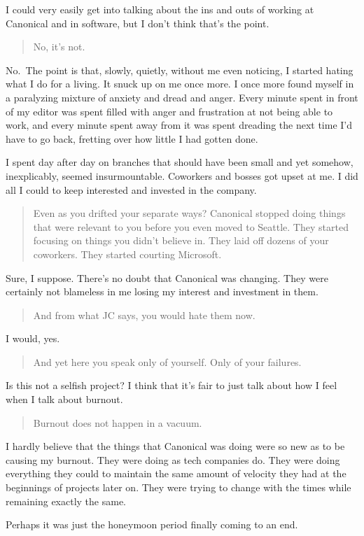 I could very easily get into talking about the ins and outs of working at Canonical and in software, but I don't think that's the point.

\begin{quote}
No, it's not.
\end{quote}

No.~The point is that, slowly, quietly, without me even noticing, I started hating what I do for a living. It snuck up on me once more. I once more found myself in a paralyzing mixture of anxiety and dread and anger. Every minute spent in front of my editor was spent filled with anger and frustration at not being able to work, and every minute spent away from it was spent dreading the next time I'd have to go back, fretting over how little I had gotten done.

I spent day after day on branches that should have been small and yet somehow, inexplicably, seemed insurmountable. Coworkers and bosses got upset at me. I did all I could to keep interested and invested in the company.

\begin{quote}
Even as you drifted your separate ways? Canonical stopped doing things that were relevant to you before you even moved to Seattle. They started focusing on things you didn't believe in. They laid off dozens of your coworkers. They started courting Microsoft.
\end{quote}

Sure, I suppose. There's no doubt that Canonical was changing. They were certainly not blameless in me losing my interest and investment in them.

\begin{quote}
And from what JC says, you would hate them now.
\end{quote}

I would, yes.

\begin{quote}
And yet here you speak only of yourself. Only of your failures.
\end{quote}

Is this not a selfish project? I think that it's fair to just talk about how I feel when I talk about burnout.

\begin{quote}
Burnout does not happen in a vacuum.
\end{quote}

I hardly believe that the things that Canonical was doing were so new as to be causing my burnout. They were doing as tech companies do. They were doing everything they could to maintain the same amount of velocity they had at the beginnings of projects later on. They were trying to change with the times while remaining exactly the same.

Perhaps it was just the honeymoon period finally coming to an end.
